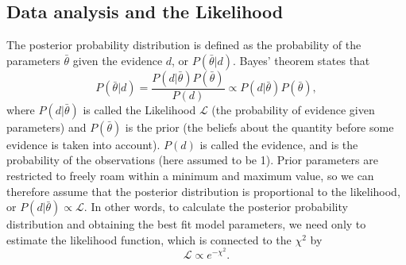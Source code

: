 \documentclass[aps,pre,twocolumn,letterpaper,floatfix,showpacs]{revtex4}
\begin{document}



\subsection{Data analysis and the Likelihood}

The posterior probability distribution is defined as the probability of the parameters $\bar \theta$ given the evidence $d$, or $P(\bar \theta | d)$. Bayes' theorem states that 
\begin{equation}
P(\bar \theta | d) = \frac{P(d | \bar \theta)P(\bar \theta)}{P(d)} \propto P(d | \bar \theta)P(\bar \theta),
\end{equation}
where $P(d | \bar \theta)$ is called the Likelihood $\mathcal L$ (the probability of evidence given parameters) and $P(\bar \theta)$ is the prior (the beliefs about the quantity before some evidence is taken into account). $P(d)$ is called the evidence, and is the probability of the observations (here assumed to be 1). Prior parameters are restricted to freely roam within a minimum and maximum value, so we can therefore assume that the posterior distribution is proportional to the likelihood, or $P(d | \bar \theta) \propto \mathcal L$. In other words, to calculate the posterior probability distribution and obtaining the best fit model parameters, we need only to estimate the likelihood function, which is connected to the $\chi^2$ by 
\begin{equation}
\mathcal L \propto e^{-\chi^2}.
\end{equation}
\end{document}
